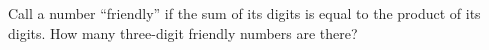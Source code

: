 Call a number ``friendly'' if the sum of its digits is equal to the product of its digits. How many three-digit friendly numbers are there?

